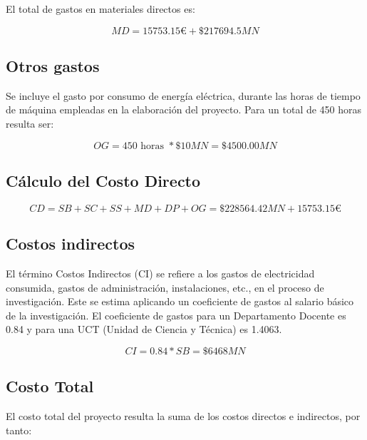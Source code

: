     El total de gastos en materiales directos es:
    
    \begin{equation}
    MD = 15753.15€ + \$217694.5 MN
    \end{equation}
    
    \subsection{Otros gastos}
    
    Se incluye el gasto por consumo de energía eléctrica, durante las horas de tiempo de máquina empleadas en la elaboración del proyecto. Para un total de 450 horas resulta ser:
    
    \begin{equation}
    OG = 450 \text{ horas } * \$10MN = \$4500.00MN
    \end{equation}
    
    \subsection{Cálculo del Costo Directo}
    
    \begin{equation}
    CD = SB + SC + SS + MD + DP + OG = \$228564.42 MN + 15753.15€
    \end{equation}
    
    \subsection{Costos indirectos}
    
    El término Costos Indirectos (CI) se refiere a los gastos de electricidad consumida, gastos de administración, instalaciones, etc., en el proceso de investigación. Este se estima aplicando un coeficiente de gastos al salario básico de la investigación. El coeficiente de gastos para un Departamento Docente es 0.84 y para una UCT (Unidad de Ciencia y Técnica) es 1.4063.
    
    \begin{equation}
    CI = 0.84 * SB = \$6468 MN
    \end{equation}

    \subsection{Costo Total}

El costo total del proyecto resulta la suma de los costos directos e indirectos, por tanto:

